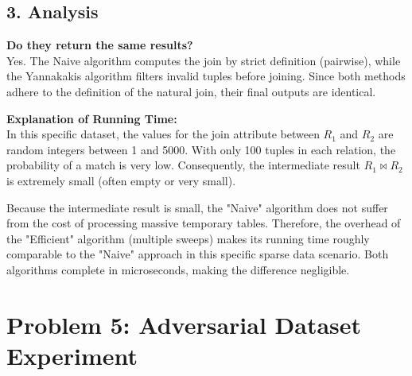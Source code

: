 \documentclass[11pt]{article}
\begin{document}
\subsection*{3. Analysis}
\textbf{Do they return the same results?} \\
Yes. The Naive algorithm computes the join by strict definition (pairwise), while the Yannakakis algorithm filters invalid tuples before joining. Since both methods adhere to the definition of the natural join, their final outputs are identical.

\textbf{Explanation of Running Time:} \\
In this specific dataset, the values for the join attribute between $R_1$ and $R_2$ are random integers between 1 and 5000. With only 100 tuples in each relation, the probability of a match is very low. Consequently, the intermediate result $R_1 \bowtie R_2$ is extremely small (often empty or very small). 

Because the intermediate result is small, the "Naive" algorithm does not suffer from the cost of processing massive temporary tables. Therefore, the overhead of the "Efficient" algorithm (multiple sweeps) makes its running time roughly comparable to the "Naive" approach in this specific sparse data scenario. Both algorithms complete in microseconds, making the difference negligible.

\section*{Problem 5: Adversarial Dataset Experiment}
\end{document}

